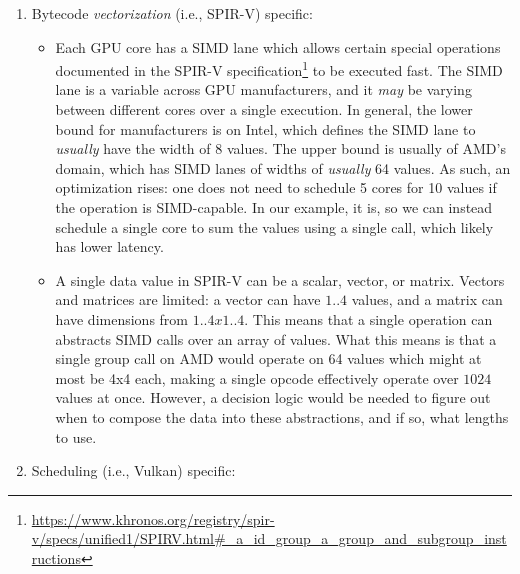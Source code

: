 \documentclass{report}
\begin{document}
\begin{enumerate}
    \item Bytecode \emph{vectorization} (i.e., SPIR-V) specific:
    \begin{itemize}
        \item Each GPU core has a SIMD lane which allows certain special operations documented in the SPIR-V specification\footnote{\url{https://www.khronos.org/registry/spir-v/specs/unified1/SPIRV.html#_a_id_group_a_group_and_subgroup_instructions}} to be executed fast. The SIMD lane is a variable across GPU manufacturers, and it \emph{may} be varying between different cores over a single execution. In general, the lower bound for manufacturers is on Intel, which defines the SIMD lane to \emph{usually} have the width of 8 values. The upper bound is usually of AMD's domain, which has SIMD lanes of widths of \emph{usually} 64 values. As such, an optimization rises: one does not need to schedule 5 cores for 10 values if the operation is SIMD-capable. In our example, it is, so we can instead schedule a single core to sum the values using a single call, which likely has lower latency.
        \item A single data value in SPIR-V can be a scalar, vector, or matrix. Vectors and matrices are limited: a vector can have $1..4$ values, and a matrix can have dimensions from $1..4 x 1..4$. This means that a single operation can abstracts SIMD calls over an array of values. What this means is that a single group call on AMD would operate on 64 values which might at most be 4x4 each, making a single opcode effectively operate over $1024$ values at once. However, a decision logic would be needed to figure out when to compose the data into these abstractions, and if so, what lengths to use. 
    \end{itemize}
    \item Scheduling (i.e., Vulkan) specific:
    \begin{itemize}

\end{itemize}
\end{enumerate}
\end{document}
